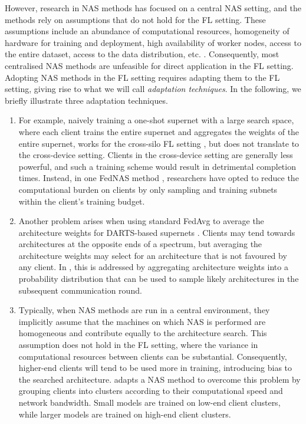 However, research in NAS methods has focused on a central NAS setting, and the methods rely on assumptions that do not hold for the FL setting. These assumptions include an abundance of computational resources, homogeneity of hardware for training and deployment, high availability of worker nodes, access to the entire dataset, access to the data distribution, etc. \cite{fl_advances_and_open_problems_2021}. Consequently, most centralised NAS methods are unfeasible for direct application in the FL setting. Adopting NAS methods in the FL setting requires adapting them to the FL setting, giving rise to what we will call \textit{adaptation techniques}. In the following, we briefly illustrate three adaptation techniques. 

\begin{enumerate}
    \item For example, naively training a one-shot supernet with a large search space, where each client trains the entire supernet and aggregates the weights of the entire supernet, works for the cross-silo FL setting \cite{fednas_2021}, but does not translate to the cross-device setting. Clients in the cross-device setting are generally less powerful, and such a training scheme would result in detrimental completion times. Instead, in one FedNAS method \cite{fedoras_2022}, researchers have opted to reduce the computational burden on clients by only sampling and training subnets within the client's training budget.
    \item Another problem arises when using standard FedAvg to average the architecture weights for DARTS-based supernets \cite{darts_2019}. Clients may tend towards architectures at the opposite ends of a spectrum, but averaging the architecture weights may select for an architecture that is not favoured by any client. In \cite{efnas_2024}, this is addressed by aggregating architecture weights into a probability distribution that can be used to sample likely architectures in the subsequent communication round.
    \item Typically, when NAS methods are run in a central environment, they implicitly assume that the machines on which NAS is performed are homogeneous and contribute equally to the architecture search. This assumption does not hold in the FL setting, where the variance in computational resources between clients can be substantial. Consequently, higher-end clients will tend to be used more in training, introducing bias to the searched architecture. \cite{network_aware_fed_nas_2025} adapts a NAS method to overcome this problem by grouping clients into clusters according to their computational speed and network bandwidth. Small models are trained on low-end client clusters, while larger models are trained on high-end client clusters.
\end{enumerate}


